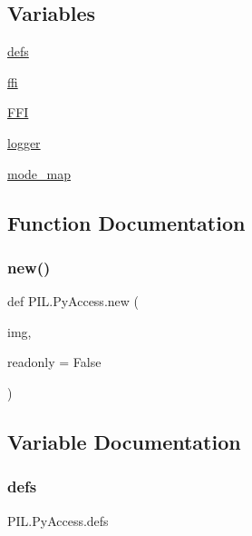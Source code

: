 \subsection*{Variables}
\begin{DoxyCompactItemize}
\item 
\hyperlink{namespacePIL_1_1PyAccess_a8f97ba761e8cbac407b1b899b8656f5a}{defs}
\item 
\hyperlink{namespacePIL_1_1PyAccess_ad5a03aa5539d95d307d73e28678bd68d}{ffi}
\item 
\hyperlink{namespacePIL_1_1PyAccess_a2cc770f92f023e5c568f6469d36d636f}{F\+FI}
\item 
\hyperlink{namespacePIL_1_1PyAccess_a5bff931bfeffd7696ddcdded13d75f07}{logger}
\item 
\hyperlink{namespacePIL_1_1PyAccess_a4bec41dbf1811b01f783b0461b74abb3}{mode\+\_\+map}
\end{DoxyCompactItemize}


\subsection{Function Documentation}
\mbox{\label{namespacePIL_1_1PyAccess_af4ffe30cdfeb35ecea5dac2a1a70c50e}} 
\subsubsection{\texorpdfstring{new()}{new()}}
{\footnotesize\ttfamily def P\+I\+L.\+Py\+Access.\+new (\begin{DoxyParamCaption}\item[{}]{img,  }\item[{}]{readonly = {\ttfamily False} }\end{DoxyParamCaption})}



\subsection{Variable Documentation}
\mbox{\label{namespacePIL_1_1PyAccess_a8f97ba761e8cbac407b1b899b8656f5a}} 
\subsubsection{\texorpdfstring{defs}{defs}}
{\footnotesize\ttfamily P\+I\+L.\+Py\+Access.\+defs}

